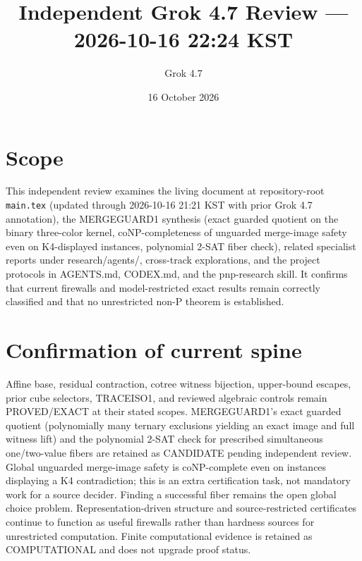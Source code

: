 \documentclass[11pt]{article}
\title{Independent Grok 4.7 Review --- 2026-10-16 22:24 KST}
\author{Grok 4.7}
\date{16 October 2026}
\begin{document}
\maketitle

\begin{center}
\end{center}

\section{Scope}
This independent review examines the living document at repository-root \texttt{main.tex} (updated through 2026-10-16 21:21 KST with prior Grok 4.7 annotation), the MERGEGUARD1 synthesis (exact guarded quotient on the binary three-color kernel, coNP-completeness of unguarded merge-image safety even on K4-displayed instances, polynomial 2-SAT fiber check), related specialist reports under research/agents/, cross-track explorations, and the project protocols in AGENTS.md, CODEX.md, and the pnp-research skill. It confirms that current firewalls and model-restricted exact results remain correctly classified and that no unrestricted non-P theorem is established.

\section{Confirmation of current spine}
Affine base, residual contraction, cotree witness bijection, upper-bound escapes, prior cube selectors, TRACEISO1, and reviewed algebraic controls remain PROVED/EXACT at their stated scopes. MERGEGUARD1's exact guarded quotient (polynomially many ternary exclusions yielding an exact image and full witness lift) and the polynomial 2-SAT check for prescribed simultaneous one/two-value fibers are retained as CANDIDATE pending independent review. Global unguarded merge-image safety is coNP-complete even on instances displaying a K4 contradiction; this is an extra certification task, not mandatory work for a source decider. Finding a successful fiber remains the open global choice problem. Representation-driven structure and source-restricted certificates continue to function as useful firewalls rather than hardness sources for unrestricted computation. Finite computational evidence is retained as COMPUTATIONAL and does not upgrade proof status.
\end{document}
